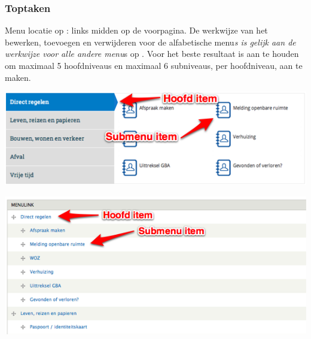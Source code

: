 \bigskip

\subsubsection{Toptaken}\label{toptaken}
Menu locatie op \drupalpath{}: links midden op de voorpagina. De werkwijze van het bewerken, toevoegen en verwijderen voor de alfabetische menu\emph{s is gelijk aan de werkwijze voor alle andere menu}s op \drupalpath{}. Voor het beste resultaat is aan te houden om maximaal 5 hoofdniveaus en maximaal 6 subniveaus, per hoofdniveau, aan te maken.

\bigskip

\begin{center}
	\includegraphics[width=\textwidth]{img/menu_toptaken.png}
\end{center}

\begin{center}
	\includegraphics[width=\textwidth]{img/menu_toptaken2.png}
\end{center}